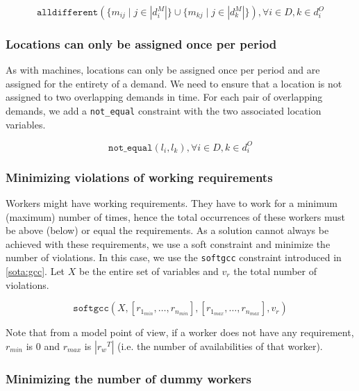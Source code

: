 \documentclass[../../thesis.tex]{subfiles}
\begin{document}
\begin{equation}
  \label{}
  \texttt{alldifferent}(\{ m_{ij} \mid j \in |d_i^M| \} \cup \{ m_{kj} \mid j \in |d_k^M| \}), \forall i \in D, k \in d^O_i
\end{equation}

\subsubsection{Locations can only be assigned once per period}

As with machines, locations can only be assigned once per period and are assigned for the entirety of a demand. We need 
to ensure that a location is not assigned to two overlapping demands in time. For each pair of overlapping demands,
we add a \texttt{not_equal} constraint with the two associated location variables.

\begin{equation}
  \label{}
  \texttt{not_equal}(l_{i}, l_{k}), \forall i \in D, k \in d^O_i
\end{equation}


\subsubsection{Minimizing violations of working requirements}

Workers might have working requirements. They have to work for a minimum (maximum) number of times, hence the total 
occurrences of these workers must be above (below) or equal the requirements. As a solution cannot always be 
achieved with these requirements, we use a soft constraint and minimize the number of violations. In this case,
we use the \texttt{softgcc} constraint introduced in \autoref{sota:gcc}. Let $X$ be the entire set of variables and 
$v_r$ the total number of violations.

\begin{equation}
  \texttt{softgcc}(X, [r_{1_{min}}, \dots, r_{n_{min}}], [r_{1_{max}}, \dots, r_{n_{max}}], v_{r}) \label{cp:wrequirements} 
\end{equation}

Note that from a model point of view, if a worker does not have any requirement, $r_{min}$ is 0 and $r_{max}$ is $|{r_w}^T| $ (i.e. the number of availabilities of that worker).


\subsubsection{Minimizing the number of dummy workers}
\end{document}
